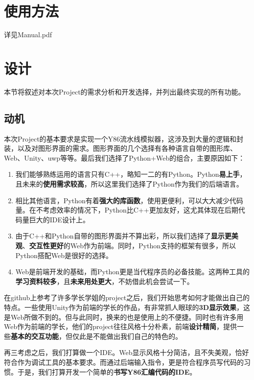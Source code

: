 \documentclass[12pt]{article} %
\begin{document}
\begin{sloppypar}
\section{使用方法}
详见Manual.pdf

\clearpage
\section{设计}

本节将叙述对本次Project的需求分析和开发选择，并列出最终实现的所有功能。

\subsection{动机}

本次Project的基本要求是实现一个Y86流水线模拟器，这涉及到大量的逻辑和封装，以及对图形界面的需求。图形界面的几个选择有各种语言自带的图形库、Web、Unity、uwp等等。最后我们选择了Python+Web的组合，主要原因如下：

\begin{enumerate}
\item 我们能够熟练运用的语言只有C++，略知一二的有Python。Python{\bf 易上手}，且未来的{\bf 使用需求较高}，所以这里我们选择了Python作为我们的后端语言。

\item 相比其他语言，Python有着{\bf 强大的库函数}，使用更便利，可以大大减少代码量。在不考虑效率的情况下，Python比C++更加友好，这尤其体现在后期代码量巨大的IDE设计上。

\item 由于C++和Python自带的图形界面并不算出彩，所以我们选择了{\bf 显示更美观}、{\bf 交互性更好}的Web作为前端。同时，Python支持的框架有很多，所以Python搭配Web是很好的选择。

\item Web是前端开发的基础，而Python更是当代程序员的必备技能。这两种工具的{\bf 学习资料较多}，且{\bf 未来用处更大}，不妨借此机会尝试一下。
\end{enumerate}

在github上参考了许多学长学姐的project之后，我们开始思考如何才能做出自己的特点。一些使用Unity作为前端的学长的作品，有非常抓人眼球的{\bf 3D显示效果}，这是Web所做不到的。但与此同时，换来的也是使用上的不便捷。同时也有许多用Web作为前端的学长，他们的project往往风格十分朴素，前端{\bf 设计精简}，提供一些{\bf 基本的交互功能}，但仅此是不能做出我们自己的特色的。

再三考虑之后，我们打算做一个IDE。Web显示风格十分简洁，且不失美观，恰好符合作为调试工具的基本要求。而通过后端输入指令，更是符合程序员写代码的习惯。于是，我们打算开发一个简单的{\bf 书写Y86汇编代码的IDE}。


\end{sloppypar}
\end{document}
